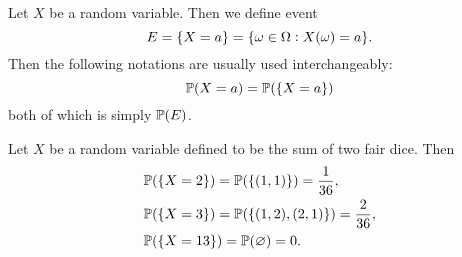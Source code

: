 \begin{definition}
	Let $X$ be a random variable. Then we define event 
	\[ E = \{X = a\} = \{\omega \in \Omega: X(\omega) = a\}. \]
	Then the following notations are usually used interchangeably:
	\[ \mathbb{P}(X=a) = \mathbb{P}(\{X=a\})  \]
	both of which is simply $\mathbb{P}(E)$.
\end{definition}

\begin{example}
	Let $X$ be a random variable defined to be the sum of two fair dice. Then 
	\begin{align*}
		&\mathbb{P}(\{X =2\}) = \mathbb{P}(\{(1,1)\}) = \frac{1}{36},\\
		&\mathbb{P}(\{X=3\}) = \mathbb{P}(\{(1,2),(2,1)\}) = \frac{2}{36},\\
		&\mathbb{P}(\{X=13\}) = \mathbb{P}(\varnothing) = 0.
	\end{align*}
\end{example}

